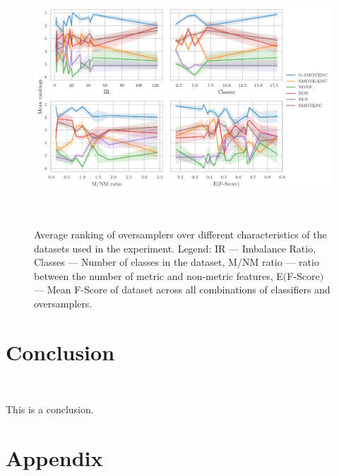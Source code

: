 \documentclass[parskip=full]{scrartcl}
\begin{document}
\begin{figure}
	\centering
	\includegraphics[width=\linewidth]{../analysis/consistency_analysis_plot}
    \caption{Average ranking of oversamplers over different characteristics of
        the datasets used in the experiment. Legend: IR --- Imbalance Ratio,
        Classes --- Number of classes in the dataset, M/NM ratio --- ratio
        between the number of metric and non-metric features, E$($F-Score$)$
        --- Mean F-Score of dataset across all combinations of classifiers and
        oversamplers.
    }~\label{fig:consistency_analysis}
\end{figure}

\section{Conclusion}~\label{sec:conclusion}

This is a conclusion.




\appendix

\section{Appendix}


\end{document}
